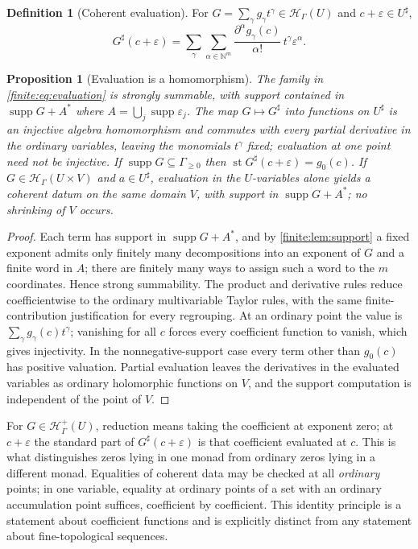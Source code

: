 \documentclass[11pt,letterpaper]{article}
\newtheorem{proposition}[theorem]{Proposition}
\theoremstyle{definition}
\newtheorem{definition}[theorem]{Definition}
\theoremstyle{remark}
\newcommand{\N}{\mathbb N}
\newcommand{\HH}{\mathscr H}
\newcommand{\Hp}{\mathscr H^{+}}
\newcommand{\sh}{^{\sharp}}
\DeclareMathOperator{\supp}{supp}
\DeclareMathOperator{\st}{st}
\numberwithin{equation}{section}
\begin{document}
\begin{definition}[Coherent evaluation]
\label{finite:def:eval}
For $G=\sum_\gamma g_\gamma t^\gamma\in\HH_\Gamma(U)$ and $c+\varepsilon\in U\sh$,
\begin{equation}\label{finite:eq:evaluation}
 G\sh(c+\varepsilon)
 =\sum_{\gamma}\sum_{\alpha\in\N^m}
 \frac{\partial^\alpha g_\gamma(c)}{\alpha!}\,t^\gamma\varepsilon^\alpha .
\end{equation}
\end{definition}

\begin{proposition}[Evaluation is a homomorphism]
\label{finite:prop:evaluation}
The family in \eqref{finite:eq:evaluation} is strongly summable, with support contained in $\supp G+A^*$ where $A=\bigcup_j\supp\varepsilon_j$. The map $G\mapsto G\sh$ into functions on $U\sh$ is an injective algebra homomorphism and commutes with every partial derivative in the ordinary variables, leaving the monomials $t^\gamma$ fixed; evaluation at one point need not be injective. If $\supp G\subseteq\Gamma_{\geq0}$ then $\st G\sh(c+\varepsilon)=g_0(c)$. If $G\in\HH_\Gamma(U\times V)$ and $a\in U\sh$, evaluation in the $U$-variables alone yields a coherent datum on the \emph{same} domain $V$, with support in $\supp G+A^*$; no shrinking of $V$ occurs.
\end{proposition}

\begin{proof}
Each term has support in $\supp G+A^*$, and by \cref{finite:lem:support} a fixed exponent admits only finitely many decompositions into an exponent of $G$ and a finite word in $A$; there are finitely many ways to assign such a word to the $m$ coordinates. Hence strong summability. The product and derivative rules reduce coefficientwise to the ordinary multivariable Taylor rules, with the same finite-contribution justification for every regrouping. At an ordinary point the value is $\sum_\gamma g_\gamma(c)t^\gamma$; vanishing for all $c$ forces every coefficient function to vanish, which gives injectivity. In the nonnegative-support case every term other than $g_0(c)$ has positive valuation. Partial evaluation leaves the derivatives in the evaluated variables as ordinary holomorphic functions on $V$, and the support computation is independent of the point of $V$.
\end{proof}

For $G\in\Hp_\Gamma(U)$, reduction means taking the coefficient at exponent zero; at $c+\varepsilon$ the standard part of $G\sh(c+\varepsilon)$ is that coefficient evaluated at $c$. This is what distinguishes zeros lying in one monad from ordinary zeros lying in a different monad. Equalities of coherent data may be checked at all \emph{ordinary} points; in one variable, equality at ordinary points of a set with an ordinary accumulation point suffices, coefficient by coefficient. This identity principle is a statement about coefficient functions and is explicitly distinct from any statement about fine-topological sequences.
\end{document}
